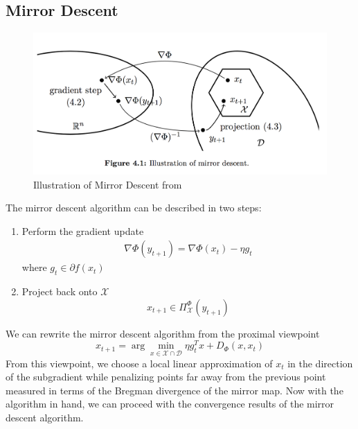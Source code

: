 \subsection{Mirror Descent}
\begin{figure}
    \centering
    \includegraphics[width = 0.75\linewidth]{Images/mda.png}
    \caption{Illustration of Mirror Descent from \citep{DBLP:journals/ftml/Bubeck15}}
    \label{fig:my_label}
\end{figure}
The mirror descent algorithm can be described in two steps:
\begin{enumerate}
\item Perform the gradient update
\begin{align}
\label{md}
    \nabla \Phi(y_{t+1}) = \nabla \Phi(x_t) - \eta g_t
\end{align}
where $g_t \in \partial f(x_t)$
\item Project back onto $\mathcal{X}$
$$x_{t+1} \in \Pi_{\mathcal{X}}^{\Phi}(y_{t+1})$$
\end{enumerate}

We can rewrite the mirror descent algorithm from the proximal viewpoint
\begin{equation*}
x_{t+1} = \arg\min_{x \in \mathcal{X}\cap \mathcal{D}} \eta g_t^Tx + D_{\Phi}(x,x_t)
\end{equation*}
From this viewpoint, we choose a local linear approximation of $x_t$ in the direction of the subgradient while penalizing points far away from the previous point measured in terms of the Bregman divergence of the mirror map. Now with the algorithm in hand, we can proceed with the convergence results of the mirror descent algorithm.

